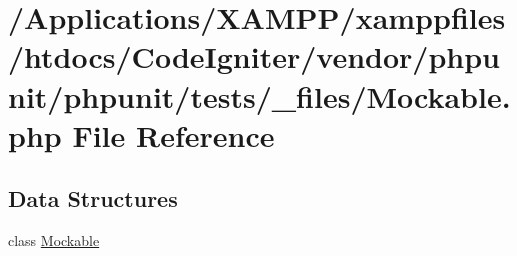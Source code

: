 \hypertarget{tests_2__files_2_mockable_8php}{}\section{/\+Applications/\+X\+A\+M\+P\+P/xamppfiles/htdocs/\+Code\+Igniter/vendor/phpunit/phpunit/tests/\+\_\+files/\+Mockable.php File Reference}
\label{tests_2__files_2_mockable_8php}
\subsection*{Data Structures}
\begin{DoxyCompactItemize}
\item 
class \mbox{\hyperlink{class_mockable}{Mockable}}
\end{DoxyCompactItemize}

